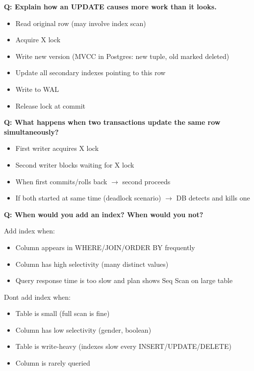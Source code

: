\documentclass[11pt]{article}
\providecommand{\tightlist}{\setlength{\itemsep}{1pt}\setlength{\parskip}{0pt}}
\begin{document}
\textbf{Q: Explain how an UPDATE causes more work than it looks.}

\begin{itemize}
\tightlist
\item
  Read original row (may involve index scan)
\item
  Acquire X lock
\item
  Write new version (MVCC in Postgres: new tuple, old marked deleted)
\item
  Update all secondary indexes pointing to this row
\item
  Write to WAL
\item
  Release lock at commit
\end{itemize}

\textbf{Q: What happens when two transactions update the same row simultaneously?}

\begin{itemize}
\tightlist
\item
  First writer acquires X lock
\item
  Second writer blocks waiting for X lock
\item
  When first commits/rolls back \(\rightarrow\) second proceeds
\item
  If both started at same time (deadlock scenario) \(\rightarrow\) DB detects and kills one
\end{itemize}

\textbf{Q: When would you add an index? When would you not?}

Add index when:

\begin{itemize}
\tightlist
\item
  Column appears in WHERE/JOIN/ORDER BY frequently
\item
  Column has high selectivity (many distinct values)
\item
  Query response time is too slow and plan shows Seq Scan on large table
\end{itemize}

Don\textquotesingle t add index when:

\begin{itemize}
\tightlist
\item
  Table is small (full scan is fine)
\item
  Column has low selectivity (gender, boolean)
\item
  Table is write-heavy (indexes slow every INSERT/UPDATE/DELETE)
\item
  Column is rarely queried
\end{itemize}
\end{document}
